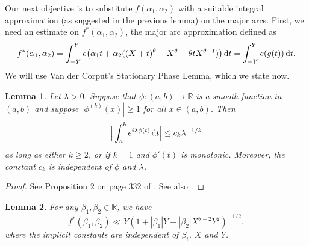 \documentclass[11pt,reqno]{amsart}
\numberwithin{equation}{section}
\newtheorem{lemma}{Lemma}[section]
\renewcommand{\d}{\,{\rm d}}
\begin{document}
Our next objective is to substitute $f(\alpha_1,\alpha_2)$ with a suitable integral approximation (as suggested in the previous lemma) on the major arcs. First, we need an estimate on $f^*(\alpha_1, \alpha_2)$, the major arc approximation defined as 
\[ f^*(\alpha_1, \alpha_2) = \int_{-Y}^Y e\big(\alpha_1t+\alpha_2( (X+t)^{\theta}-X^{\theta}-\theta t X^{\theta-1} )\big)\d t = \int_{-Y}^Y e(g(t))\d t. \]
We will use Van der Corput's Stationary Phase Lemma, which we state now. 
\begin{lemma} \label{lem:VDCstat} 
Let $\lambda > 0$. Suppose that $\phi: (a,b) \to \mathbb{R}$ is a smooth function in $(a,b)$ and suppose $|\phi^{(k)}(x)| \geq 1$ for all $x \in (a,b)$. Then 
\[ \Big|\int_a^b e^{i\lambda \phi(t)} \d t \Big| \leq c_k\lambda^{-1/k} \]
as long as either $k \geq 2$, or if $k = 1$ and $\phi'(t)$ is monotonic. Moreover, the constant $c_k$ is independent of $\phi$ and $\lambda$. 
\end{lemma}

\begin{proof} See Proposition 2 on page 332 of \cite{Stein}. See also \cite{VDC}. 
\end{proof}

\begin{lemma} \label{lem:apprest}
For any $\beta_1, \beta_2 \in \mathbb{R}$, we have 
\[ f^*(\beta_1, \beta_2) \ll Y(1+|\beta_1|Y+|\beta_2|X^{\theta-2}Y^2)^{-1/2}, \]
where the implicit constants are independent of $\beta_i$, $X$ and $Y$.
\end{lemma}
\end{document}
